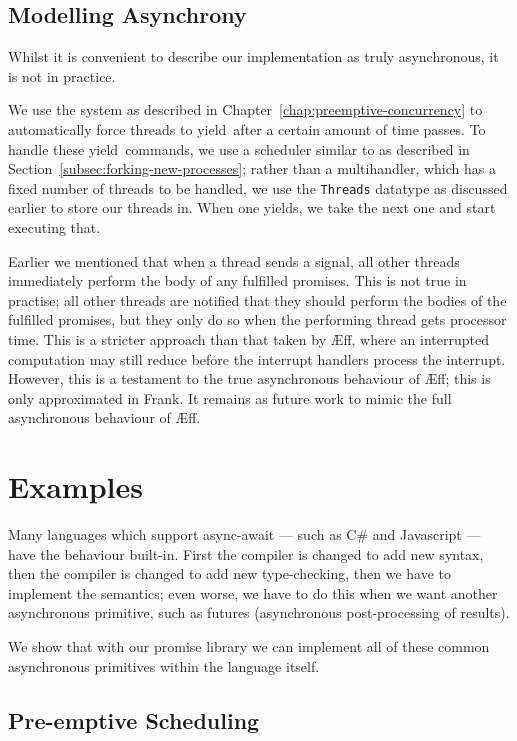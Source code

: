 \documentclass[msc,deptreport,cs]{infthesis} %
\newcommand{\code}[1]{\lstinline{#1}}
\newcommand\aeff{{\AE}ff\xspace}
\newcommand\yield{\textsf{yield}\xspace}
\begin{document}
\section{Modelling Asynchrony}

Whilst it is convenient to describe our implementation as truly asynchronous, it
is not in practice.

We use the system as described in Chapter~\ref{chap:preemptive-concurrency} to
automatically force threads to \yield~after a certain amount of time passes. To
handle these \yield~commands, we use a scheduler similar to as described in
Section~\ref{subsec:forking-new-processes}; rather than a multihandler, which
has a fixed number of threads to be handled, we use the \code{Threads} datatype
as discussed earlier to store our threads in. When one yields, we take the next
one and start executing that.

Earlier we mentioned that when a thread sends a signal, all other threads
immediately perform the body of any fulfilled promises. This is not true in
practise; all other threads are notified that they should perform the bodies of
the fulfilled promises, but they only do so when the performing thread gets
processor time.
%
This is a stricter approach than that taken by \aeff, where an interrupted
computation may still reduce before the interrupt handlers process the
interrupt. However, this is a testament to the true asynchronous behaviour of
\aeff; this is only approximated in Frank. It remains as future work to mimic
the full asynchronous behaviour of \aeff.


\chapter{Examples}
\label{chap:examples}

Many languages which support async-await --- such as C# and Javascript --- have
the behaviour built-in. First the compiler is changed to add new syntax, then
the compiler is changed to add new type-checking, then we have to implement the
semantics; even worse, we have to do this when we want another asynchronous
primitive, such as futures (asynchronous post-processing of results).

We show that with our promise library we can implement all of these common
asynchronous primitives within the language itself.

\section{Pre-emptive Scheduling}
\label{sec:pre-emptive-scheduling}
\end{document}
